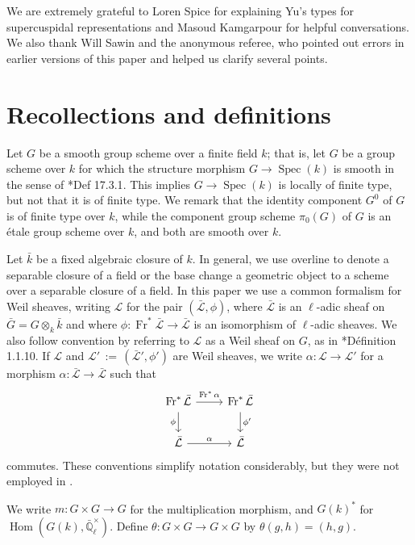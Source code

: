 \documentclass[10pt]{amsart}
\theoremstyle{plain}
\theoremstyle{definition}
\newcommand{\EE}{\mathbb{\bar Q}_\ell}
\newcommand{\bFq}{\bar{k}}
\newcommand{\Fq}{k}
\newcommand{\EEx}{\EE^\times}
\newcommand{\Frob}[1]{\operatorname{Fr}_{#1}}
\DeclareMathOperator{\Hom}{Hom}
\newcommand{\Spec}[1]{{\operatorname{Spec}(#1)}}
\newcommand{\ceq}{{\, :=\, }}
\newcommand{\cs}[1]{{\mathcal{#1}}}
\newcommand{\gcs}[1]{{\mathcal{\bar #1}}}
\newcommand{\bG}{\bar{G}}
\begin{document}
\bigskip

We are extremely grateful to Loren Spice for explaining Yu's types for supercuspidal representations and Masoud Kamgarpour for helpful conversations.
We also thank Will Sawin and the anonymous referee, who pointed out errors in earlier versions of this paper and helped us clarify several points.

\section{Recollections and definitions} \label{sec:defs}

Let $G$ be a smooth group scheme over a finite field $\Fq$; that is, let $G$ be a group scheme over $\Fq$
for which the structure morphism $G \to \Spec{\Fq}$ is smooth in the sense of \cite{EGAIV4}*{Def 17.3.1}.
This implies $G \to \Spec{\Fq}$ is locally of finite type, but not that it is of finite type.
We remark that the identity component $G^0$ of $G$ is of finite type over $\Fq$, while the component group scheme
$\pi_0(G)$ of $G$ is an \'etale group scheme over $\Fq$, and both are smooth over $\Fq$.

Let $\bFq$ be a fixed algebraic closure of $\Fq$. 
In general, we use overline to denote a separable closure of a field or the base change a geometric object to a scheme over a separable closure of a field.
%
In this paper we use a common formalism for Weil sheaves, writing $\cs{L}$ for the pair $(\gcs{L},\phi)$, where $\gcs{L}$ is an $\ell$-adic sheaf on $\bG = G\otimes_{\Fq} \bFq$  and where $\phi : \Frob{}^*\gcs{L} \to \gcs{L}$ is an isomorphism of $\ell$-adic sheaves. 
We also follow convention by referring to $\cs{L}$  as a Weil sheaf on $G$, as in \cite{Deligne:Weil}*{D\'efinition 1.1.10}.
If $\cs{L}$ and $\cs{L}' \ceq (\gcs{L}', \phi')$ are Weil sheaves, we write $\alpha : \cs{L} \to \cs{L}'$ for a morphism $\alpha : \gcs{L} \to \gcs{L}$ such that 
\[
\begin{tikzcd}
\Frob{}^* \gcs{L} \arrow{d}[swap]{\phi} \arrow{r}{\Frob{}^*\alpha} &  \Frob{}^* \gcs{L} \arrow{d}{\phi'}\\
\gcs{L} \arrow{r}{\alpha} & \gcs{L}
\end{tikzcd}
\]
commutes.  
These conventions simplify notation considerably, but they were not employed in \cite{cunningham-roe:13a}.

We write $m : G \times G \to G$ for the multiplication morphism, and $G(k)^*$ for $\Hom(G(k), \EEx)$.
Define $\theta : G\times G \to G\times G$ by $\theta(g,h) = (h,g)$.
\end{document}
